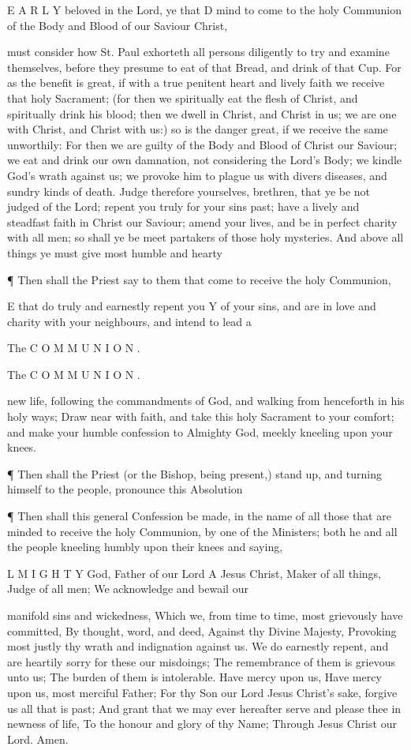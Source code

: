 E A R L Y beloved in the Lord, ye that D mind to come to the holy Communion of the Body and Blood of our Saviour Christ,

must consider how St. Paul exhorteth all persons diligently to try and examine themselves, before they presume to eat of that Bread, and drink of that Cup. For as the benefit is great, if with a true penitent heart and lively faith we receive that holy Sacrament; (for then we spiritually eat the flesh of Christ, and spiritually drink his blood; then we dwell in Christ, and Christ in us; we are one with Christ, and Christ with us:) so is the danger great, if we receive the same unworthily: For then we are guilty of the Body and Blood of Christ our Saviour; we eat and drink our own damnation, not considering the Lord’s Body; we kindle God’s wrath against us; we provoke him to plague us with divers diseases, and sundry kinds of death. Judge therefore yourselves, brethren, that ye be not judged of the Lord; repent you truly for your sins past; have a lively and steadfast faith in Christ our Saviour; amend your lives, and be in perfect charity with all men; so shall ye be meet partakers of those holy mysteries. And above all things ye must give most humble and hearty

¶ Then shall the Priest say to them that come to receive the holy Communion,

E that do truly and earnestly repent you Y of your sins, and are in love and charity with your neighbours, and intend to lead a

The C O M M U N I O N .

The C O M M U N I O N .

new life, following the commandments of God, and walking from henceforth in his holy ways; Draw near with faith, and take this holy Sacrament to your comfort; and make your humble confession to Almighty God, meekly kneeling upon your knees.

¶ Then shall the Priest (or the Bishop, being present,) stand up, and turning himself to the people, pronounce this Absolution

¶ Then shall this general Confession be made, in the name of all those that are minded to receive the holy Communion, by one of the Ministers; both he and all the people kneeling humbly upon their knees and saying,

L M I G H T Y God, Father of our Lord A Jesus Christ, Maker of all things, Judge of all men; We acknowledge and bewail our

manifold sins and wickedness, Which we, from time to time, most grievously have committed, By thought, word, and deed, Against thy Divine Majesty, Provoking most justly thy wrath and indignation against us. We do earnestly repent, and are heartily sorry for these our misdoings; The remembrance of them is grievous unto us; The burden of them is intolerable. Have mercy upon us, Have mercy upon us, most merciful Father; For thy Son our Lord Jesus Christ’s sake, forgive us all that is past; And grant that we may ever hereafter serve and please thee in newness of life, To the honour and glory of thy Name; Through Jesus Christ our Lord. Amen.


